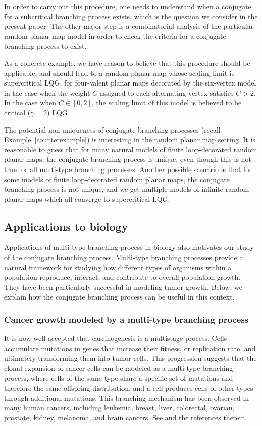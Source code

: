 \documentclass[11pt]{article}
\theoremstyle{plain}
\theoremstyle{definition}
\numberwithin{equation}{section}
\begin{document}
In order to carry out this procedure, one needs to understand when a conjugate for a subcritical branching process exists, which is the question we consider in the present paper. The other major step is a combinatorial analysis of the particular random planar map model in order to check the criteria for a conjugate branching process to exist. 

As a concrete example, we have reason to believe that this procedure should be applicable, and should lead to a random planar map whose scaling limit is supercritical LQG, for four-valent planar maps decorated by the six-vertex model in the case when the weight $C$ assigned to each alternating vertex satisfies $C > 2$. In the case when $C\in [0,2]$, the scaling limit of this model is believed to be critical ($\gamma=2$) LQG~\cite{zinn-justin-six-vertex,kostov-six-vertex}. 

The potential non-uniqueness of conjugate branching processes (recall Example~\ref{counterexample}) is interesting in the random planar map setting. It is reasonable to guess that for many natural models of finite loop-decorated random planar maps, the conjugate branching process is unique, even though this is not true for all multi-type branching processes. Another possible scenario is that for some models of finite loop-decorated random planar maps, the conjugate branching process is not unique, and we get multiple models of infinite random planar maps which all converge to supercritical LQG.


\subsection{Applications to biology} \label{sec-bio}
Applications of multi-type branching process in biology also motivates our study of the conjugate branching process.  
Multi-type branching processes provide a natural framework for studying how different types of organisms within a population reproduce, interact, and contribute to overall population growth. They have been particularly successful in modeling tumor growth. Below, we explain how the conjugate branching process can be useful in this context.

\subsubsection*{Cancer growth modeled by a multi-type branching process}
It is now well accepted that carcinogenesis is a multistage process. Cells accumulate mutations in genes that increase their fitness, or replication rate, and ultimately transforming them into tumor cells. This progression suggests that the clonal expansion of cancer cells can be modeled as a multi-type branching process, where cells of the same type share a specific set of mutations and therefore the same offspring distribution, and a cell produces cells of other types through additional mutations. This branching mechanism has been observed in many human cancers, including leukemia, breast, liver, colorectal, ovarian, prostate, kidney, melanoma, and brain cancers. See \cite[Section 6]{Davis2017} and the references therein. 
\end{document}
